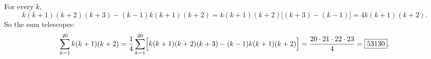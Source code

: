 For every $k$,
\[
k(k+1)(k+2)(k+3)-(k-1)k(k+1)(k+2)=k(k+1)(k+2)\bigl[(k+3)-(k-1)\bigr]=4k(k+1)(k+2).
\]
So the sum telescopes:
\[
\sum_{k=1}^{20}k(k+1)(k+2)=\dfrac{1}{4}\sum_{k=1}^{20}\Bigl[k(k+1)(k+2)(k+3)-(k-1)k(k+1)(k+2)\Bigr]=\dfrac{20\cdot21\cdot22\cdot23}{4}=\boxed{53130}.
\]
